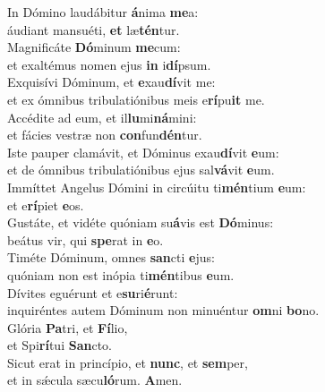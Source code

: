 \evenverse In Dómino laudábitur \textbf{á}nima \textbf{me}a:~\*\\
\evenverse áudiant mansuéti, \textbf{et} læ\textbf{tén}tur.\\
\oddverse Magnificáte \textbf{Dó}minum \textbf{me}cum:~\*\\
\oddverse et exaltémus nomen ejus \textbf{in} i\textbf{dí}psum.\\
\evenverse Exquisívi Dóminum, et \textbf{e}xau\textbf{dí}vit me:~\*\\
\evenverse et ex ómnibus tribulatiónibus meis e\textbf{rí}pu\textbf{it} me.\\
\oddverse Accédite ad eum, et il\textbf{lu}mi\textbf{ná}mini:~\*\\
\oddverse et fácies vestræ non \textbf{con}fun\textbf{dén}tur.\\
\evenverse Iste pauper clamávit, et Dóminus exau\textbf{dí}vit \textbf{e}um:~\*\\
\evenverse et de ómnibus tribulatiónibus ejus sal\textbf{vá}vit \textbf{e}um.\\
\oddverse Immíttet Angelus Dómini in circúitu ti\textbf{mén}tium \textbf{e}um:~\*\\
\oddverse et e\textbf{rí}piet \textbf{e}os.\\
\evenverse Gustáte, et vidéte quóniam su\textbf{á}vis est \textbf{Dó}minus:~\*\\
\evenverse beátus vir, qui \textbf{spe}rat in \textbf{e}o.\\
\oddverse Timéte Dóminum, omnes \textbf{san}cti \textbf{e}jus:~\*\\
\oddverse quóniam non est inópia ti\textbf{mén}tibus \textbf{e}um.\\
\evenverse Dívites eguérunt et e\textbf{su}ri\textbf{é}runt:~\*\\
\evenverse inquiréntes autem Dóminum non minuéntur \textbf{om}ni \textbf{bo}no.\\
\oddverse Glória \textbf{Pa}tri, et \textbf{Fí}lio,~\*\\
\oddverse et Spi\textbf{rí}tui \textbf{San}cto.\\
\evenverse Sicut erat in princípio, et \textbf{nunc}, et \textbf{sem}per,~\*\\
\evenverse et in sǽcula sæcu\textbf{ló}rum. \textbf{A}men.\\
